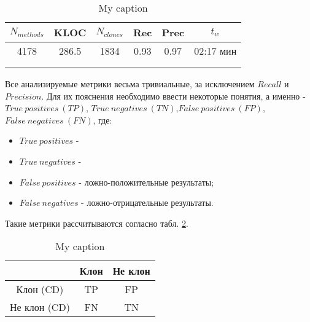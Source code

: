 \begin{table}[H]
\centering
\captionsetup{skip=5pt}
\caption{My caption}
\label{testing}
\begin{tabular}{|c|c|c|c|c|c|}
\hline
\(N_{methods}\) & KLOC  & \(N_{clones}\) & Rec  & Prec & \(t_w\)     \\ \hline
4178     & 286.5 & 1834      & 0.93 & 0.97 & 02:17 мин \\ \hline
         &       &           &      &      &       \\ \hline
         &       &           &      &      &       \\ \hline
\end{tabular}
\end{table}

Все анализируемые метрики весьма тривиальные, за исключением \(Recall\) и \(Precision\). Для их пояснения необходимо ввести некоторые понятия, а именно - \(True\ positives\ (TP)\), \(True\ negatives\ (TN)\),\(False\ positives\ (FP)\), \(False\ negatives\ (FN)\), где:

\begin{itemize}
\setlength\itemsep{0mm}
\item \(True\ positives\) - 
\item \(True\ negatives\) - 
\item \(False\ positives\) - ложно-положительные результаты;
\item \(False\ negatives\) - ложно-отрицательные результаты.
\end{itemize}

Такие метрики рассчитываются согласно табл. \ref{truepos}.

\begin{table}[H]
\centering
\captionsetup{skip=5pt}
\caption{My caption}
\label{truepos}
\begin{tabular}{c|c|c|}
\cline{2-3}
                                   & Клон & Не клон \\ \hline
\multicolumn{1}{|c|}{Клон (CD)}    & TP   & FP      \\ \hline
\multicolumn{1}{|c|}{Не клон (CD)} & FN   & TN      \\ \hline
\end{tabular}
\end{table}
